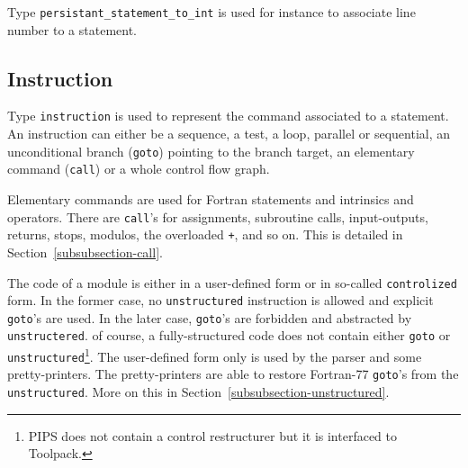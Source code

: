 \documentclass[a4paper]{article}
\begin{document}
{}

Type \texttt{persistant\_statement\_to\_int} is used for instance to
associate line number to a statement.

\subsection{Instruction}
\label{subsection-instruction}


Type \texttt{instruction} is used to represent the command associated to a
statement. An instruction can either be a sequence, a test, a loop,
parallel or sequential, an unconditional branch (\texttt{goto}) pointing to
the branch target, an elementary command (\texttt{call}) or a whole control
flow graph.

Elementary commands are used for Fortran statements and intrinsics and
operators. There are \texttt{call}'s for assignments,
subroutine calls, input-outputs, returns, stops, modulos, the overloaded
\texttt{+}, and so on. This is detailed in
Section~\ref{subsubsection-call}.

The code of a module is either in a user-defined form or in so-called
\texttt{controlized} form. In the former case, no \texttt{unstructured}
instruction is allowed and explicit \texttt{goto}'s are used. In the later
case, \texttt{goto}'s are forbidden and abstracted by
\texttt{unstructered}. of course, a fully-structured code does not contain
either \texttt{goto} or \texttt{unstructured}\footnote{PIPS does not contain a
control restructurer but it is interfaced to Toolpack.}. The
user-defined form only is used by the parser and some
pretty-printers. The pretty-printers are able to restore Fortran-77
\texttt{goto}'s from the \texttt{unstructured}. More on this in
Section~\ref{subsubsection-unstructured}.

\begin{comment}
Le domaine \verb/instruction/ permet de repr�senter les instructions
d'un module. Une instruction peut �tre un sous-domaine \verb/block/,
c'est-�-dire une liste de \verb/statement/, un sous-domaine \verb/test/
pour les instructions de test, un sous-domaine \verb/loop/ pour les
boucles s�quentielles, un sous-domaine \verb/goto/ pour les goto qui
contient le
\verb/statement/ vers lequel le goto se branche, un sous-domaine
\verb/call/ pour toutes les autres instructions (affectation, appel de
subroutine, entr�es-sorties, return, stop, etc) ou un sous-domaine de
\verb/unstructured/ dans le cas ou` l'on traite d'un graphe de contr�le
structur�. Toutes ces instructions
sont repr�sent�es par des appels � des fonctions pr�d�finies dont
nous �tudierons la nature plus loin.
\end{comment}
\end{document}
